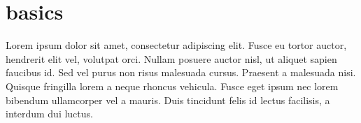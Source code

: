 \chapter{basics}
\label{chap:basics}
Lorem ipsum dolor sit amet, consectetur adipiscing elit. Fusce eu tortor auctor,
hendrerit elit vel, volutpat orci. Nullam posuere auctor nisl, ut aliquet sapien
faucibus id. Sed vel purus non risus malesuada cursus. Praesent a malesuada
nisi. Quisque fringilla lorem a neque rhoncus vehicula. Fusce eget ipsum nec
lorem bibendum ullamcorper vel a mauris. Duis tincidunt felis id lectus
facilisis, a interdum dui luctus.
